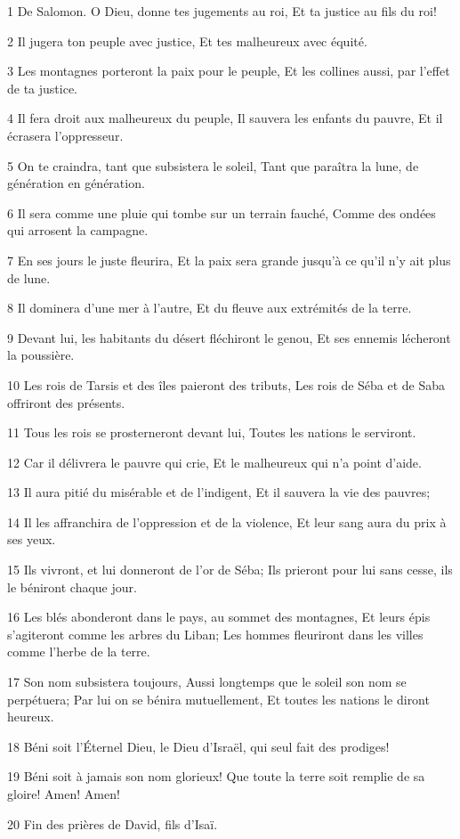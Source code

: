 \par 1 De Salomon. O Dieu, donne tes jugements au roi, Et ta justice au fils du roi!
\par 2 Il jugera ton peuple avec justice, Et tes malheureux avec équité.
\par 3 Les montagnes porteront la paix pour le peuple, Et les collines aussi, par l'effet de ta justice.
\par 4 Il fera droit aux malheureux du peuple, Il sauvera les enfants du pauvre, Et il écrasera l'oppresseur.
\par 5 On te craindra, tant que subsistera le soleil, Tant que paraîtra la lune, de génération en génération.
\par 6 Il sera comme une pluie qui tombe sur un terrain fauché, Comme des ondées qui arrosent la campagne.
\par 7 En ses jours le juste fleurira, Et la paix sera grande jusqu'à ce qu'il n'y ait plus de lune.
\par 8 Il dominera d'une mer à l'autre, Et du fleuve aux extrémités de la terre.
\par 9 Devant lui, les habitants du désert fléchiront le genou, Et ses ennemis lécheront la poussière.
\par 10 Les rois de Tarsis et des îles paieront des tributs, Les rois de Séba et de Saba offriront des présents.
\par 11 Tous les rois se prosterneront devant lui, Toutes les nations le serviront.
\par 12 Car il délivrera le pauvre qui crie, Et le malheureux qui n'a point d'aide.
\par 13 Il aura pitié du misérable et de l'indigent, Et il sauvera la vie des pauvres;
\par 14 Il les affranchira de l'oppression et de la violence, Et leur sang aura du prix à ses yeux.
\par 15 Ils vivront, et lui donneront de l'or de Séba; Ils prieront pour lui sans cesse, ils le béniront chaque jour.
\par 16 Les blés abonderont dans le pays, au sommet des montagnes, Et leurs épis s'agiteront comme les arbres du Liban; Les hommes fleuriront dans les villes comme l'herbe de la terre.
\par 17 Son nom subsistera toujours, Aussi longtemps que le soleil son nom se perpétuera; Par lui on se bénira mutuellement, Et toutes les nations le diront heureux.
\par 18 Béni soit l'Éternel Dieu, le Dieu d'Israël, qui seul fait des prodiges!
\par 19 Béni soit à jamais son nom glorieux! Que toute la terre soit remplie de sa gloire! Amen! Amen!
\par 20 Fin des prières de David, fils d'Isaï.

